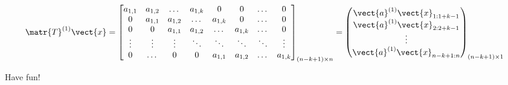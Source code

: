 \[
\matr{T}^{(1)}\vect{x} =
\begin{bmatrix}
    a_{1,1} & a_{1,2} & \dotsc & a_{1,k} & 0 & 0 & \dotsc & 0 \\
    0 & a_{1,1} & a_{1,2} & \dotsc & a_{1,k} & 0 & \dotsc & 0 \\
    0 & 0 & a_{1,1} & a_{1,2} & \dotsc & a_{1,k} & \dotsc & 0 \\
    \vdots & \vdots & \vdots & \ddots & \ddots & \ddots & \ddots & \vdots \\
    0 & \dotsc & 0 & 0 & a_{1,1} & a_{1,2} & \dotsc & a_{1,k}
\end{bmatrix}_{(n-k+1) \times n} =
\begin{pmatrix}
    \vect{a}^{(1)} \vect{x}_{1:1+k-1} \\ \vect{a}^{(1)} \vect{x}_{2:2+k-1} \\ \vdots \\ \vect{a}^{(1)}  \vect{x}_{n-k+1:n}
\end{pmatrix}_{(n-k+1) \times 1}
\]

Have fun!